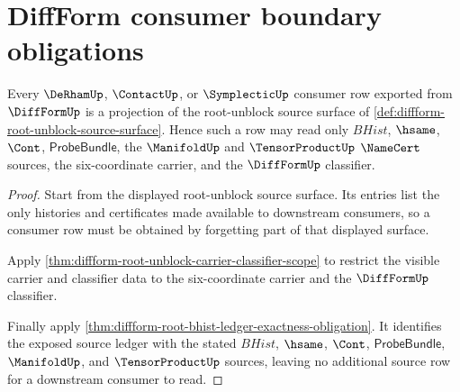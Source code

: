 \section{DiffForm consumer boundary obligations}
\label{sec:diffform-consumer-boundary-obligations}

\begin{theorem}
\label{thm:diffform-consumer-source-scope}
Every $\DeRhamUp$, $\ContactUp$, or $\SymplecticUp$ consumer row exported
from $\DiffFormUp$ is a projection of the root-unblock source surface of
\autoref{def:diffform-root-unblock-source-surface}. Hence such a row may read
only $BHist$, $\hsame$, $\Cont$, $\mathsf{ProbeBundle}$, the
$\ManifoldUp$ and $\TensorProductUp$ $\NameCert$ sources, the
six-coordinate carrier, and the $\DiffFormUp$ classifier.
\end{theorem}
\begin{proof}
Start from the displayed root-unblock source surface. Its entries list the
only histories and certificates made available to downstream consumers, so a
consumer row must be obtained by forgetting part of that displayed surface.

Apply \autoref{thm:diffform-root-unblock-carrier-classifier-scope} to restrict
the visible carrier and classifier data to the six-coordinate carrier and the
$\DiffFormUp$ classifier.

Finally apply
\autoref{thm:diffform-root-bhist-ledger-exactness-obligation}. It identifies
the exposed source ledger with the stated $BHist$, $\hsame$, $\Cont$,
$\mathsf{ProbeBundle}$, $\ManifoldUp$, and $\TensorProductUp$ sources, leaving
no additional source row for a downstream consumer to read.
\end{proof}

